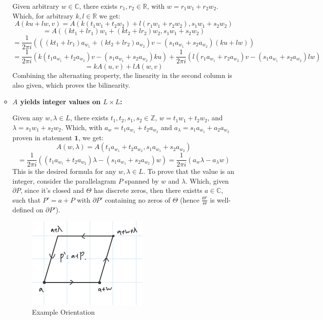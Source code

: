 \documentclass{article}
\begin{document}
\begin{itemize}
\begin{itemize}
        Given arbitrary $w \in\mathbb{C}$, there exists $r_1,r_2\in\mathbb{R}$, with $w=r_1w_1+r_2w_2$. Which, for arbitrary $k,l\in\mathbb{R}$ we get:
        $$A(ku+lw,v)=A(k(t_1w_1+t_2w_2)+l(r_1w_1+r_2w_2),s_1w_1+s_2w_2)$$
        $$ = A((kt_1+lr_1)w_1+(kt_2+lr_2)w_2,s_1w_1+s_2w_2)$$
        $$= \frac{1}{2\pi i}(((kt_1+lr_1)a_{w_1}+(kt_2+lr_2)a_{w_2})v-(s_1a_{w_1}+s_2a_{w_2})(ku+lw))$$
        $$ = \frac{1}{2\pi i}\left(k(t_1a_{w_1}+t_2a_{w_2})v - (s_1a_{w_1}+s_2a_{w_2})ku\right)+\frac{1}{2\pi i}\left(l(r_1a_{w_1}+r_2a_{w_2})v - (s_1a_{w_1}+s_2a_{w_2})lw\right)$$
        $$ = kA(u,v)+lA(w,v)$$
        Combining the alternating property, the linearity in the second column is also given, which proves the bilinearity.

        \item \textbf{$A$ yields integer values on $L\times L$:}
        
        Given any $w,\lambda\in L$, there exists $t_1,t_2,s_1,s_2\in \mathbb{Z}$, $w=t_1w_1+t_2w_2$, and $\lambda = s_1w_1+s_2w_2$. Which, with $a_w=t_1a_{w_1}+t_2a_{w_2}$ and $a_{\lambda}=s_1a_{w_1}+a_2a_{w_2}$ proven in statement $\textbf{1}$, we get:
        $$A(w,\lambda) = A(t_1a_{w_1}+t_2a_{w_2},s_1a_{w_1}+s_2a_{w_2})$$
        $$=\frac{1}{2\pi i}((t_1a_{w_1}+t_2a_{w_2})\lambda - (s_1a_{w_1}+s_2a_{w_2})w) = \frac{1}{2\pi i}(a_w\lambda -a_\lambda w)$$
        This is the desired formula for any $w,\lambda\in L$. To prove that the value is an integer, consider the parallelagram $P$ spanned by $w$ and $\lambda$. Which, given $\partial P$, since it's closed and $\Theta$ has discrete zeros, then there existts $a\in\mathbb{C}$, such that $P'=a+P$ with $\partial P'$ containing no zeros of $\Theta$ (hence $\frac{\Theta'}{\Theta}$ is well-defined on $\partial P'$). 
        
        \begin{figure}[h!]
            \begin{center}
                \includegraphics*[width=60mm]{q2 orient 1.jpg}
                \caption{Example Orientation}
            \end{center}
        \end{figure}
        

\end{itemize}
\end{itemize}
\end{document}
